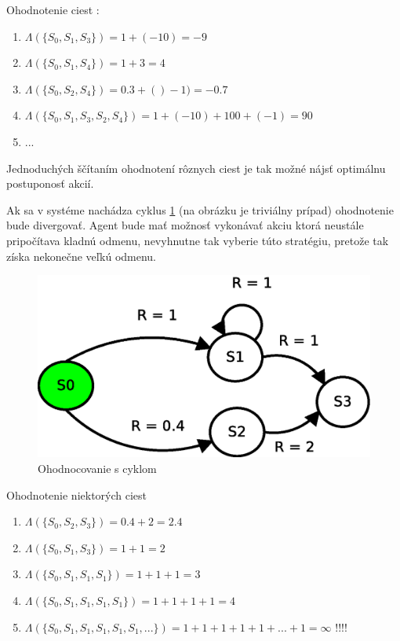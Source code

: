 Ohodnotenie ciest :
\begin{enumerate}
  \item $\Lambda(\{S_0, S_1, S_3\}) = 1+(-10) = -9$
  \item $\Lambda(\{S_0, S_1, S_4\}) = 1+3 = 4$
  \item $\Lambda(\{S_0, S_2, S_4\}) = 0.3 +()-1) =-0.7$
  \item $\Lambda(\{S_0, S_1, S_3, S_2, S_4\}) = 1 +(-10) +100 + (-1) = 90$
  \item ...
\end{enumerate}

Jednoduchých ščítaním ohodnotení rôznych ciest je tak možné nájsť optimálnu
postuponosť akcií.

Ak sa v systéme nachádza cyklus \ref{img:cycle_states_system} (na obrázku
je triviálny prípad) ohodnotenie bude divergovať. Agent bude mať možnosť
vykonávať akciu ktorá neustále pripočítava kladnú odmenu, nevyhnutne tak
vyberie túto stratégiu, pretože tak získa nekonečne veľkú odmenu.

\begin{figure}[!htb]
\centering
\includegraphics[scale=.6]{../diagrams/rf_cycle_states.eps}
\caption{Ohodnocovanie s cyklom}
\label{img:cycle_states_system}
\end{figure}

Ohodnotenie niektorých ciest
\begin{enumerate}
  \item $\Lambda(\{S_0, S_2, S_3\}) = 0.4+2 = 2.4$
  \item $\Lambda(\{S_0, S_1, S_3\}) = 1+1 = 2$
  \item $\Lambda(\{S_0, S_1, S_1, S_1\}) = 1+1+1 = 3$
  \item $\Lambda(\{S_0, S_1, S_1, S_1, S_1\}) = 1+1+1+1 = 4$
  \item $\Lambda(\{S_0, S_1, S_1, S_1, S_1, S_1, ...\}) = 1+1+1+1+1+...+1 = \infty$ !!!!
\end{enumerate}

